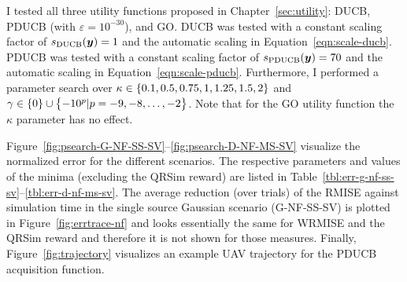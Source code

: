I tested all three utility functions proposed in Chapter~\ref{sec:utility}: 
DUCB, PDUCB (with $\varepsilon = 10^{-30}$), and GO\@. DUCB was tested with 
a constant scaling factor of $s_{\mathrm{DUCB}}(\bm{y}) = 1$ and the automatic scaling 
in Equation~\ref{eqn:scale-ducb}.  PDUCB was tested with a constant scaling 
factor of $s_{\mathrm{PDUCB}}(\bm{y}) = 70$ and the automatic scaling in 
Equation~\ref{eqn:scale-pducb}.  Furthermore, I performed a parameter search 
over $\kappa \in \cbr{0.1, 0.5, 
0.75, 1, 1.25, 1.5, 2}$ and $\gamma \in \cbr{0} \cup \cbr{-10^p | p = -9, -8, 
  \dots, -2}$. Note that for the GO utility function the $\kappa$ parameter has 
no effect.

Figure~\ref{fig:psearch-G-NF-SS-SV}--\ref{fig:psearch-D-NF-MS-SV} visualize the 
normalized error for the different scenarios.  The respective parameters and 
values of the minima (excluding the QRSim reward) are listed in 
Table~\ref{tbl:err-g-nf-ss-sv}--\ref{tbl:err-d-nf-ms-sv}.  The average reduction 
(over trials) of the RMISE against simulation time in the single source Gaussian 
scenario (G-NF-SS-SV) is plotted in Figure~\ref{fig:errtrace-nf} and looks 
essentially the same for WRMISE and the QRSim reward and therefore it is not 
shown for those measures. Finally, Figure~\ref{fig:trajectory} visualizes an 
example UAV trajectory for the PDUCB acquisition function.

